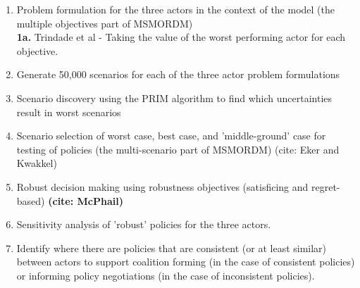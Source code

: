 \begin{enumerate}
    \item  Problem formulation for the three actors in the context of the model (the multiple objectives part of MSMORDM)\\
    \textbf{1a.} Trindade et al - Taking the value of the worst performing actor for each objective.
    \item  Generate 50,000 scenarios for each of the three actor problem formulations
    \item  Scenario discovery using the PRIM algorithm to find which uncertainties result in worst scenarios
    \item Scenario selection of worst case, best case, and 'middle-ground' case for testing of policies (the multi-scenario part of MSMORDM) (cite: Eker and Kwakkel)
    \item Robust decision making using robustness objectives (satisficing and regret-based) \textbf{(cite: McPhail)}
    \item Sensitivity analysis of 'robust' policies for the three actors.
    \item Identify where there are policies that are consistent (or at least similar) between actors to support coalition forming (in the case of consistent policies) or informing policy negotiations (in the case of inconsistent policies).
\end{enumerate}


